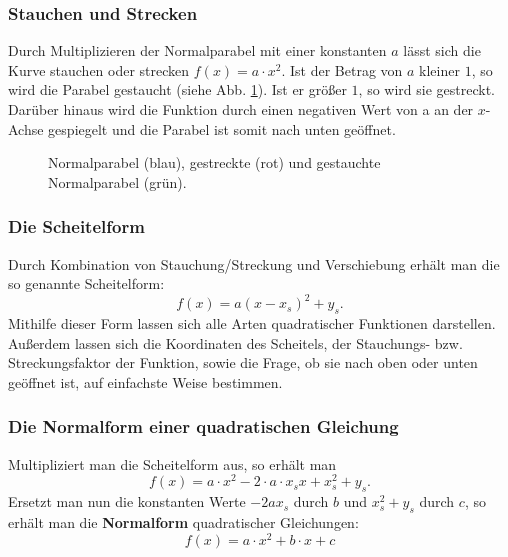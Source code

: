 \subsubsection{Stauchen und Strecken}
Durch Multiplizieren der Normalparabel mit einer konstanten $a$ lässt sich die Kurve stauchen oder strecken $f(x)=a \cdot x^2$. Ist der Betrag von $a$ kleiner $1$, so wird die Parabel gestaucht (siehe Abb. \ref{fig:parabel}). Ist er größer $1$, so wird sie gestreckt. Darüber hinaus wird die Funktion durch einen negativen Wert von a an der $x$-Achse gespiegelt und die Parabel ist somit nach unten geöffnet.
\begin{figure}[h!]
\begin{center}
\end{center}
\caption{Normalparabel (blau), gestreckte (rot) und gestauchte Normalparabel (grün).}
\label{fig:parabel}
\end{figure}

\subsubsection{Die Scheitelform}
Durch Kombination von Stauchung/Streckung und Verschiebung erhält man die so genannte Scheitelform: 
\begin{equation*}
f(x)=a(x-x_s)^2+y_s.
\end{equation*}
Mithilfe dieser Form lassen sich alle Arten quadratischer Funktionen darstellen. Außerdem lassen sich die Koordinaten des Scheitels, der Stauchungs- bzw. Streckungsfaktor der Funktion, sowie die Frage, ob sie nach oben oder unten geöffnet ist, auf einfachste Weise bestimmen.

\subsubsection{Die Normalform einer quadratischen Gleichung}
Multipliziert man die Scheitelform aus, so erhält man 
\begin{equation*}
f(x)=a \cdot x^2-2 \cdot a \cdot x_sx+x_s^2+y_s.
\end{equation*}
Ersetzt man nun die konstanten Werte $-2ax_s$ durch $b$ und $x_s^2+y_s$ durch $c$, so erhält man die \textbf{Normalform} quadratischer Gleichungen:
\begin{equation*}
f(x)=a \cdot x^2+b \cdot x+c
\end{equation*}

